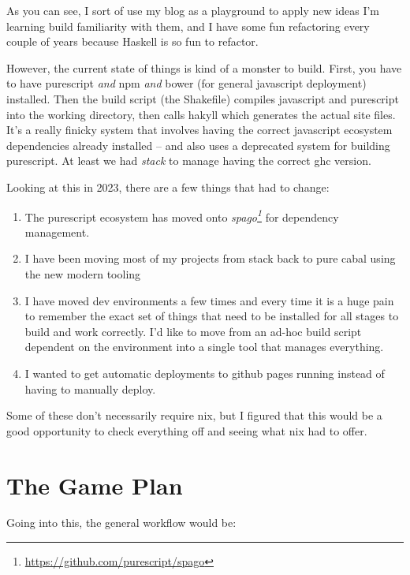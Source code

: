 \documentclass[]{article}
\renewcommand{\href}[2]{#2\footnote{\url{#1}}}
\begin{document}
As you can see, I sort of use my blog as a playground to apply new ideas I'm
learning build familiarity with them, and I have some fun refactoring every
couple of years because Haskell is so fun to refactor.

However, the current state of things is kind of a monster to build. First, you
have to have purescript \emph{and} npm \emph{and} bower (for general javascript
deployment) installed. Then the build script (the Shakefile) compiles javascript
and purescript into the working directory, then calls hakyll which generates the
actual site files. It's a really finicky system that involves having the correct
javascript ecosystem dependencies already installed -- and also uses a
deprecated system for building purescript. At least we had \emph{stack} to
manage having the correct ghc version.

Looking at this in 2023, there are a few things that had to change:

\begin{enumerate}
\def\labelenumi{\arabic{enumi}.}
\tightlist
\item
  The purescript ecosystem has moved onto
  \emph{\href{https://github.com/purescript/spago}{spago}} for dependency
  management.
\item
  I have been moving most of my projects from stack back to pure cabal using the
  new modern tooling
\item
  I have moved dev environments a few times and every time it is a huge pain to
  remember the exact set of things that need to be installed for all stages to
  build and work correctly. I'd like to move from an ad-hoc build script
  dependent on the environment into a single tool that manages everything.
\item
  I wanted to get automatic deployments to github pages running instead of
  having to manually deploy.
\end{enumerate}

Some of these don't necessarily require nix, but I figured that this would be a
good opportunity to check everything off and seeing what nix had to offer.

\section{The Game Plan}\label{the-game-plan}

Going into this, the general workflow would be:
\end{document}
